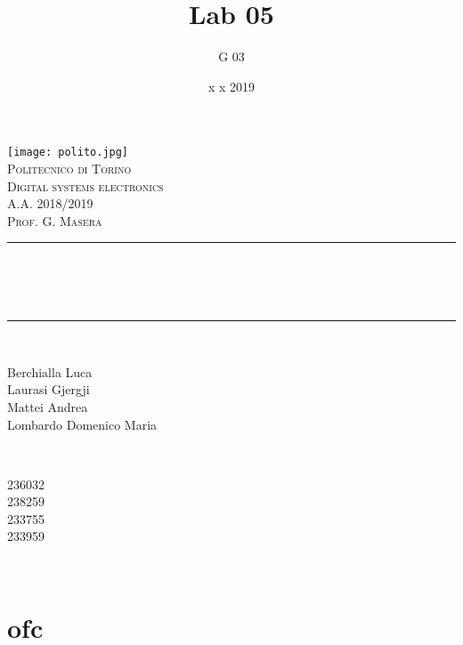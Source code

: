 \documentclass[12pt]{article}
\title{Lab 05}													%
\author{G 03}														%
\date{x x 2019}														%
\makeatletter
\let\thetitle\@title
\let\thedate\@date
\makeatother
\begin{document}

\begin{titlepage}
	\centering
    \vspace*{0.5 cm}
    \texttt{[image: polito.jpg]}\\[1.0 cm]				%
    \textsc{\LARGE Politecnico di Torino}\\[2.0 cm]						%
	\textsc{\Large Digital systems electronics\\ A.A. 2018/2019}\\[0.5 cm]		%
	\textsc{\Large Prof. G. Masera}\\[0.5 cm]		%
	\rule{\linewidth}{0.2 mm} \\[0.4 cm]
	{ \huge \bfseries \thetitle \\ \small \thedate}\\
	\rule{\linewidth}{0.2 mm} \\[1.5 cm]
	
	\begin{minipage}{0.4\textwidth}
		\begin{flushleft} \large
			Berchialla Luca\\												%
			Laurasi Gjergji
			\\
			
			Mattei Andrea\\
            Lombardo Domenico Maria\\
            
			\end{flushleft}
			\end{minipage}~
			\begin{minipage}{0.4\textwidth}
            
			\begin{flushright} \large
			236032\\													%
			238259\\
            233755\\
            233959\\
            
		\end{flushright}
        
	\end{minipage}\\[2 cm]
	
\end{titlepage}

\newpage

\section{}
\section{}
\section{}
\section{}


\section{ofc}
\end{document}
